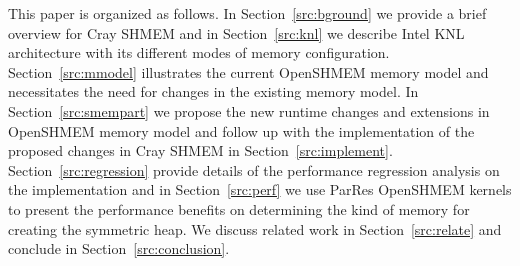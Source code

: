 This paper is organized as follows.
In Section~\ref{src:bground} we provide a brief overview for Cray SHMEM
and in Section~\ref{src:knl} we describe Intel KNL architecture with its
different modes of memory configuration. Section~\ref{src:mmodel}
illustrates the current OpenSHMEM memory model and necessitates the need
for changes in the existing memory model. In Section~\ref{src:smempart}
we propose the new runtime changes and extensions in OpenSHMEM memory
model and follow up with the implementation of the proposed changes in
Cray SHMEM in Section~\ref{src:implement}.
Section~\ref{src:regression} provide details of the performance
regression analysis on the implementation and in Section~\ref{src:perf}
we use ParRes OpenSHMEM kernels to present the performance benefits on
determining the kind of memory for creating the symmetric heap. We
discuss related work in Section~\ref{src:relate} and conclude in
Section~\ref{src:conclusion}.